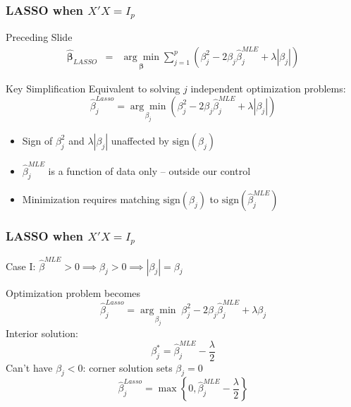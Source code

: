 \begin{frame}
  \frametitle{LASSO when $X'X = I_p$}
  \begin{block}{Preceding Slide}
    \vspace{-1.5em}
\begin{eqnarray*}
  \widehat{\boldsymbol{\beta}}_{LASSO} 
  &=& \underset{\boldsymbol{\beta}}{\arg \min}  \sum_{j=1}^p \left(\beta_j^2 - 2 \beta_j \widehat{\beta}^{MLE}_j + \lambda\left|\beta_j \right|\right)
\end{eqnarray*}
  \end{block}

  \vspace{-1em}

  \begin{alertblock}{Key Simplification}
  Equivalent to solving $j$ independent optimization problems:
  \vspace{-0.5em}
  \[
	\widehat{\beta}^{Lasso}_j = \underset{\beta_j}{\arg \min} \left(\beta_j^2 - 2 \beta_j \widehat{\beta}^{MLE}_j + \lambda\left|\beta_j \right|\right)
  \]
  \vspace{-2em}
  \begin{itemize}
    \item Sign of $\beta_j^2$ and $\lambda |\beta_j|$ unaffected by $\mbox{sign}(\beta_j)$
    \item $\widehat{\beta}_j^{MLE}$ is a function of data only -- outside our control
    \item Minimization requires \alert{matching} $\mbox{sign}(\beta_j)$ to $\mbox{sign}(\widehat{\beta}^{MLE}_j)$
  \end{itemize}
  \end{alertblock}
\end{frame}
\begin{frame}
  \frametitle{LASSO when $X'X = I_p$}

  \begin{block}{Case I: $\widehat{\beta}^{MLE}>0 \implies \beta_j > 0 \implies |\beta_j| = \beta_j$}
    
Optimization problem becomes
\[\widehat{\beta}^{Lasso}_j = \underset{\beta_j}{\arg \min} \; \beta_j^2 - 2 \beta_j \widehat{\beta}^{MLE}_j + \lambda\beta_j\]
Interior solution:
\[\beta^*_j = \widehat{\beta}^{MLE}_j - \frac{\lambda}{2}\]
  Can't have $\beta_j<0$: corner solution sets $\beta_j = 0$
\[\widehat{\beta}^{Lasso}_j = \max\left\{0,\widehat{\beta}^{MLE}_j - \frac{\lambda}{2}\right\}\] 
  \end{block}
  
\end{frame}
